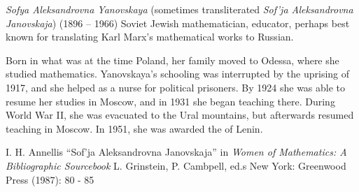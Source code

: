 \documentclass[12pt]{article}
\begin{document}
\emph{Sofya Aleksandrovna Yanovskaya} (sometimes transliterated \emph{Sof'ja Aleksandrovna Janovskaja}) (1896 -- 1966) Soviet Jewish mathematician, educator, perhaps best known for translating Karl Marx's mathematical works to Russian.

Born in what was at the time Poland, her family moved to Odessa, where she studied mathematics. Yanovskaya's schooling was interrupted by the uprising of 1917, and she helped as a nurse for political prisoners. By 1924 she was able to resume her studies in Moscow, and in 1931 she began teaching there. During World War II, she was evacuated to the Ural mountains, but afterwards resumed teaching in Moscow. In 1951, she was awarded the  of Lenin.

\begin{thebibliography}{1}
 I. H. Annellis ``Sof'ja Aleksandrovna Janovskaja'' in {\it Women of Mathematics: A Bibliographic Sourcebook} L. Grinstein, P. Cambpell, ed.s New York: Greenwood Press (1987): 80 - 85
\end{thebibliography}

\end{document}
